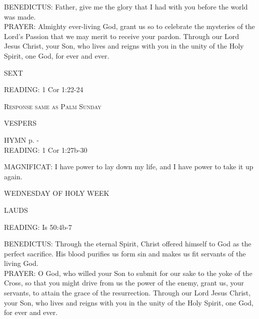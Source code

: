\noindent\small{\uppercase{BENEDICTUS:}}	Father, give me the glory that I had with you before the world was made.\\

\noindent\small{\uppercase{PRAYER:}}	Almighty ever-living God, grant us so to celebrate the mysteries of the Lord's Passion that we may merit to receive your pardon. Through our Lord Jesus Christ, your Son, who lives and reigns with you in the unity of the Holy Spirit, one God, for ever and ever.

\begin{flushleft}\normalsize{\uppercase{SEXT\\}}\end{flushleft}
\noindent\small{\uppercase{READING:}}    1 Cor 1:22-24 \textbf{   \\}

\begin{center}\textsc{Response same as Palm Sunday}\end{center}

\begin{flushleft}\normalsize{\uppercase{VESPERS\\}}\end{flushleft}
\small{\uppercase{HYMN} p. \pageref{lent:firstHymn}-\pageref{lent:lastHymn}\\}
\noindent\small{\uppercase{READING:}}    1 Cor 1:27b-30 \textbf{   \\}

\noindent\small{\uppercase{MAGNIFICAT:}}	I have power to lay down my life, and I have power to take it up again.\\

\begin{center}
\normalsize WEDNESDAY OF HOLY WEEK
\end{center}

\begin{flushleft}\normalsize{\uppercase{LAUDS\\}}\end{flushleft}
\noindent\small{\uppercase{READING:}}    Is 50:4b-7 \textbf{   \\}

\noindent\small{\uppercase{BENEDICTUS:}}	Through the eternal Spirit, Christ offered himself to God as the perfect sacrifice. His blood purifies us form sin and makes us fit servants of the living God.\\

\noindent\small{\uppercase{PRAYER:}}	O God, who willed your Son to submit for our sake to the yoke of the Cross, so that you might drive from us the power of the enemy, grant us, your servants, to attain the grace of the resurrection. Through our Lord Jesus Christ, your Son, who lives and reigns with you in the unity of the Holy Spirit, one God, for ever and ever.


